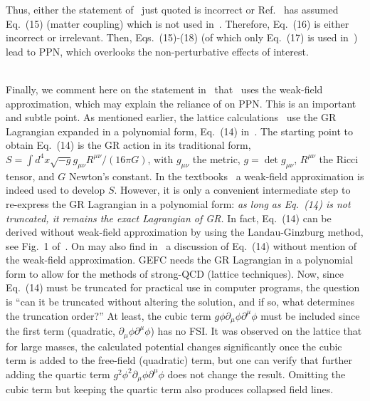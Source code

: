 \documentclass[superscriptaddress,amsmath,amssymb,nofootinbib]{revtex4}
\begin{document}
Thus, either the statement of~\cite{Barker:2023xsx} just quoted is incorrect or Ref.~\cite{Barker:2023xsx} has assumed Eq.~(15)  (matter coupling) which is not used in~\cite{Deur:2009ya, Deur:2016bwq}. Therefore, Eq.~(16) is either incorrect or irrelevant.
%
Then, Eqs.~(15)-(18) (of which only Eq.~(17) is used in~\cite{Deur:2009ya, Deur:2016bwq})
lead to PPN, which overlooks the non-perturbative effects of interest. \\
%


~

%
Finally, we comment here on the statement in~\cite{Barker:2023xsx} that~\cite{Deur:2009ya, Deur:2016bwq} uses the weak-field approximation, 
which may explain the reliance of \cite{Barker:2023xsx} on PPN. This is an important and subtle point. 
As mentioned earlier, the lattice calculations~\cite{Deur:2009ya, Deur:2016bwq} use the GR Lagrangian expanded in a polynomial form, Eq.~(14) in~\cite{Barker:2023xsx}.
The starting point to obtain Eq.~(14) is the GR action in its traditional form, 
$S=\int d^4x \sqrt{-g}g_{\mu \nu}R^{\mu \nu}/(16\pi G)$, with $g_{\mu \nu}$ 
the metric, $g=\det g_{\mu \nu}$, $R^{\mu \nu}$ the Ricci tensor, and $G$ Newton's constant. 
In the textbooks~\cite{Zee2, Zee1} a weak-field approximation is indeed used to develop $S$. 
However, it is only a convenient  intermediate step to re-express the GR Lagrangian in a polynomial 
form: {\it as long as  Eq.~(14) is not truncated, it remains the exact Lagrangian of GR.}
In fact, Eq.~(14) can be derived without weak-field approximation by using the Landau-Ginzburg method, see Fig.~1 of~\cite{Deur:2009ya}. 
On may also find in~\cite{Salam:1974zw} a discussion of Eq.~(14) without mention of the weak-field approximation. 
%
GEFC needs the  GR Lagrangian in a polynomial form to allow for the methods of strong-QCD (lattice techniques). 
Now, since Eq.~(14) must be truncated for practical use in computer programs, the question is ``can it be truncated without 
altering the solution, and if so, what determines the truncation order?'' At least, the cubic term 
$g\phi\partial_{\mu} \phi \partial^{\mu} \phi$ must be included since the first term (quadratic, $\partial_{\mu} \phi \partial^{\mu} \phi$) has no
FSI. It was observed on the lattice that for 
large masses, the calculated potential changes significantly once the cubic term is added to the free-field (quadratic) term, 
but one can verify that further adding the quartic term $g^2\phi^2\partial_{\mu} \phi \partial^{\mu} \phi$ does not change the result.
Omitting the cubic term but keeping the quartic term also produces collapsed field lines. 
\end{document}
